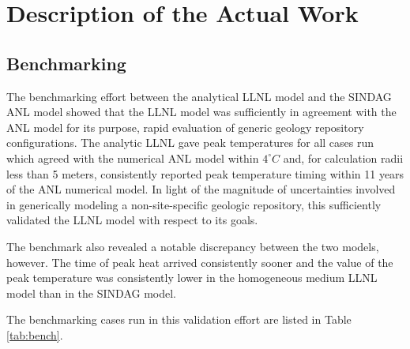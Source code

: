 \documentclass{anstrans}
\begin{document}
\section{Description of the Actual Work}

\subsection{Benchmarking}

The benchmarking effort between the analytical \gls{LLNL} model and the 
\gls{SINDAG} \gls{ANL} model showed that the \gls{LLNL} model was sufficiently 
in agreement with the \gls{ANL} model for its purpose, rapid evaluation of 
generic geology repository configurations.  The analytic \gls{LLNL} gave peak 
temperatures for all cases run which agreed with the numerical \gls{ANL} model 
within $4^{\circ}C$ and, for calculation radii less than 5 meters, consistently 
reported peak temperature timing within 11 years of 
the \gls{ANL} numerical model. In light of the magnitude of uncertainties involved 
in generically modeling a non-site-specific geologic repository, this 
sufficiently validated the \gls{LLNL} model with respect to its goals.

The benchmark also revealed a notable discrepancy between the two models, 
however. The time of peak heat arrived consistently sooner and the value of the 
peak temperature was consistently lower in the homogeneous medium \gls{LLNL} 
model than in the \gls{SINDAG} model. 

The benchmarking cases run in this validation effort are listed in Table 
\ref{tab:bench}.
\end{document}
